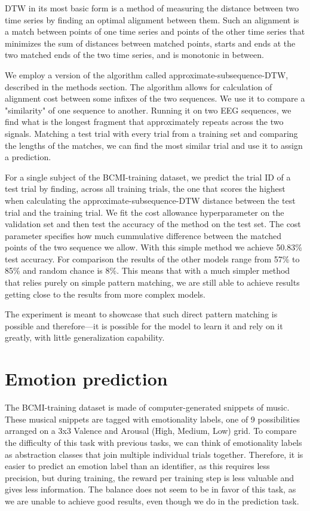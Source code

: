 DTW in its most basic form is a method of measuring the distance between two time series by finding an optimal alignment between them.
Such an alignment is a match between points of one time series and points of the other time series that minimizes the sum of distances between matched points, 
starts and ends at the two matched ends of the two time series, and is monotonic in between. 

We employ a version of the algorithm called approximate-subsequence-DTW, described in the methods section.
The algorithm allows for calculation of alignment cost between some infixes of the two sequences.
We use it to compare a "similarity" of one sequence to another.
Running it on two EEG sequences, we find what is the longest fragment that approximately repeats across the two signals.
Matching a test trial with every trial from a training set and comparing the lengths of the matches, we can find the most similar trial and use it to assign a prediction.

For a single subject of the BCMI-training dataset, we predict the trial ID of a test trial by finding, across all training trials,
the one that scores the highest when calculating the approximate-subsequence-DTW distance between the test trial and the training trial.
We fit the cost allowance hyperparameter on the validation set and then test the accuracy of the method on the test set. 
The cost parameter specifies how much cummulative difference between the matched points of the two sequence we allow.
With this simple method we achieve 50.83\% test accuracy.
For comparison the results of the other models range from 57\% to 85\% and random chance is 8\%.
This means that with a much simpler method that relies purely on simple pattern matching, we are still able to achieve results getting close to the results from more complex models.

The experiment is meant to showcase that such direct pattern matching is possible and therefore---it is possible for the model to learn it and rely on it greatly, with little generalization capability.

\section{Emotion prediction}


The BCMI-training dataset is made of computer-generated snippets of music. These musical snippets are tagged with emotionality labels, one of 9 possibilities arranged on a 3x3 Valence and Arousal (High, Medium, Low) grid.
To compare the difficulty of this task with previous tasks, we can think of emotionality labels as abstraction classes that join multiple individual trials together.
Therefore, it is easier to predict an emotion label than an identifier, as this requires less precision, but during training, the 
reward per training step is less valuable and gives less information.
The balance does not seem to be in favor of this task, as we are unable to achieve good results, even though we do in the prediction task.

